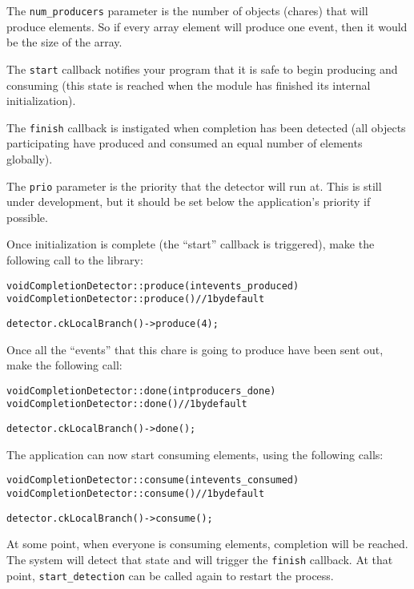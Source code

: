 The \verb|num_producers| parameter is the number of objects (chares)
that will produce elements. So if every array element will produce one
event, then it would be the size of the array.

The \verb|start| callback notifies your program that it is safe to
begin producing and consuming (this state is reached when the module
has finished its internal initialization).

The \verb|finish| callback is instigated when completion has been
detected (all objects participating have produced and consumed an
equal number of elements globally).

The \verb|prio| parameter is the priority that the detector will run
at. This is still under development, but it should be set below the
application's priority if possible.

Once initialization is complete (the ``start'' callback is triggered),
make the following call to the library:

\begin{alltt}
void CompletionDetector::produce(int events_produced)
void CompletionDetector::produce() // 1 by default
\end{alltt}

\begin{alltt}
detector.ckLocalBranch()->produce(4);
\end{alltt}

Once all the ``events'' that this chare is going to produce have been sent out,
make the following call:

\begin{alltt}
void CompletionDetector::done(int producers_done)
void CompletionDetector::done() // 1 by default
\end{alltt}

\begin{alltt}
detector.ckLocalBranch()->done();
\end{alltt}

The application can now start consuming elements, using the following calls:

\begin{alltt}
void CompletionDetector::consume(int events_consumed)
void CompletionDetector::consume() // 1 by default
\end{alltt}

\begin{alltt}
detector.ckLocalBranch()->consume();
\end{alltt}

At some point, when everyone is consuming elements, completion will be
reached. The system will detect that state and will trigger the \verb|finish|
callback. At that point, \verb|start_detection| can be called again to restart
the process.
